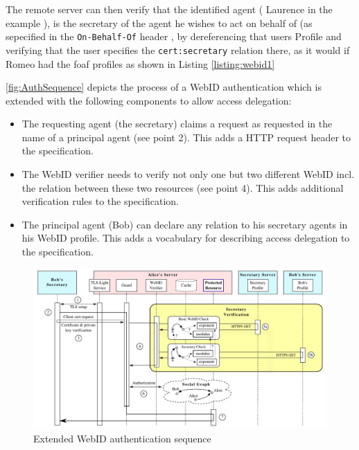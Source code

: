 \documentclass[a4paper]{llncs}
\begin{document}
The remote server can then verify that the identified agent ( Laurence in the example ), is the secretary of the agent he wishes to act on behalf of (as sepecified in the \lstinline|On-Behalf-Of| header , by dereferencing that users Profile and verifying that the user specifies the \lstinline|cert:secretary| relation there, as it would if Romeo had the foaf profiles as shown in Listing \ref{listing:webid1}




\autoref{fig:AuthSequence} depicts the process of a WebID authentication which is extended with the following components to allow access delegation:

\begin{itemize}
    \item The requesting agent (the secretary) claims a request as requested in the name of a principal agent (see point 2).
        This adds a HTTP request header to the specification.
    \item The WebID verifier needs to verify not only one but two different WebID incl. the relation between these two resources (see point 4).
        This adds additional verification rules to the specification.
    \item The principal agent (Bob) can declare any relation to his secretary agents in his WebID profile.
        This adds a vocabulary for describing access delegation to the specification.
\end{itemize}

\begin{figure}[htb]
  \centering
  \includegraphics[width=\textwidth]{AuthSequence}
  \caption{Extended WebID authentication sequence}
  \label{fig:AuthSequence}
\end{figure}
\end{document}
